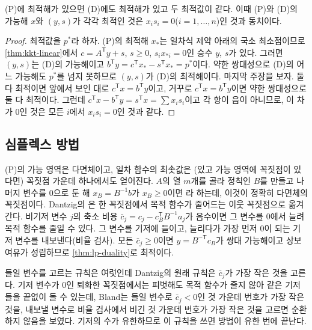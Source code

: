 \begin{theorem}[선형계획의 쌍대 정리]
\label{thm:lp-duality}
(P)에 최적해가 있으면 (D)에도 최적해가 있고 두 최적값이 같다. 이때 (P)와 (D)의 가능해 $x$와 $(y,s)$가 각각 최적인 것은 $x_is_i=0$($i=1,\dots,n$)인 것과 동치이다.
\end{theorem}

\begin{proof}
최적값을 $p^\ast$라 하자. (P)의 최적해 $x_\ast$는 일차식 제약 아래의 국소 최소점이므로 \cref{thm:kkt-linear}에서 $c=A^{\mathsf T}y+s$, $s\ge0$, $s_ix_{\ast i}=0$인 승수 $y$, $s$가 있다. 그러면 $(y,s)$는 (D)의 가능해이고 $b^{\mathsf T}y=c^{\mathsf T}x_\ast-s^{\mathsf T}x_\ast=p^\ast$이다. 약한 쌍대성으로 (D)의 어느 가능해도 $p^\ast$를 넘지 못하므로 $(y,s)$가 (D)의 최적해이다. 마지막 주장을 보자. 둘 다 최적이면 앞에서 보인 대로 $c^{\mathsf T}x=b^{\mathsf T}y$이고, 거꾸로 $c^{\mathsf T}x=b^{\mathsf T}y$이면 약한 쌍대성으로 둘 다 최적이다. 그런데 $c^{\mathsf T}x-b^{\mathsf T}y=s^{\mathsf T}x=\sum x_is_i$이고 각 항이 음이 아니므로, 이 차가 $0$인 것은 모든 $i$에서 $x_is_i=0$인 것과 같다.
\end{proof}

\subsection{심플렉스 방법}

(P)의 가능 영역은 다면체이고, 일차 함수의 최솟값은 (있고 가능 영역에 꼭짓점이 있다면) 꼭짓점 가운데 하나에서도 얻어진다. $A$의 열 $m$개를 골라 정칙인 $B$를 만들고 나머지 변수를 $0$으로 둔 해 $x_B=B^{-1}b$가 $x_B\ge0$이면 라 하는데, 이것이 정확히 다면체의 꼭짓점이다. Dantzig의 은 한 꼭짓점에서 목적 함수가 줄어드는 이웃 꼭짓점으로 옮겨 간다\cite{dantzig1963}. 비기저 변수 $j$의 축소 비용 $\bar c_j=c_j-c_B^{\mathsf T}B^{-1}a_j$가 음수이면 그 변수를 $0$에서 늘려 목적 함수를 줄일 수 있다. 그 변수를 기저에 들이고, 늘리다가 가장 먼저 $0$이 되는 기저 변수를 내보낸다(비율 검사). 모든 $\bar c_j\ge0$이면 $y=B^{-\mathsf T}c_B$가 쌍대 가능해이고 상보 여유가 성립하므로 \cref{thm:lp-duality}로 최적이다.

들일 변수를 고르는 규칙은 여럿인데 Dantzig의 원래 규칙은 $\bar c_j$가 가장 작은 것을 고른다. 기저 변수가 $0$인 퇴화한 꼭짓점에서는 피벗해도 목적 함수가 줄지 않아 같은 기저들을 끝없이 돌 수 있는데, Bland는 들일 변수로 $\bar c_j<0$인 것 가운데 번호가 가장 작은 것을, 내보낼 변수로 비율 검사에서 비긴 것 가운데 번호가 가장 작은 것을 고르면 순환하지 않음을 보였다\cite{bland1977}. 기저의 수가 유한하므로 이 규칙을 쓰면 방법이 유한 번에 끝난다.

